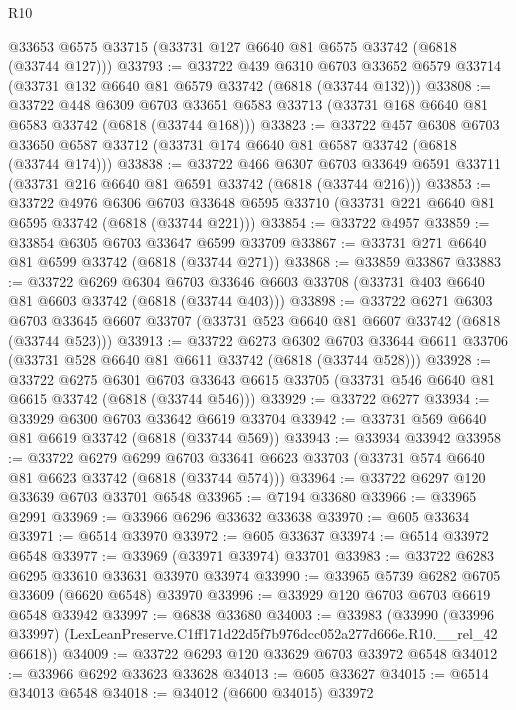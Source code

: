 \begin{lexlean}{R10}
\begin{coremodule}
    @33653
    @6575
    @33715
    (@33731 @127 @6640 @81 @6575 @33742 (@6818 (@33744 @127)))
@33793 := @33722
    @439
    @6310
    @6703
    @33652
    @6579
    @33714
    (@33731 @132 @6640 @81 @6579 @33742 (@6818 (@33744 @132)))
@33808 := @33722
    @448
    @6309
    @6703
    @33651
    @6583
    @33713
    (@33731 @168 @6640 @81 @6583 @33742 (@6818 (@33744 @168)))
@33823 := @33722
    @457
    @6308
    @6703
    @33650
    @6587
    @33712
    (@33731 @174 @6640 @81 @6587 @33742 (@6818 (@33744 @174)))
@33838 := @33722
    @466
    @6307
    @6703
    @33649
    @6591
    @33711
    (@33731 @216 @6640 @81 @6591 @33742 (@6818 (@33744 @216)))
@33853 := @33722
    @4976
    @6306
    @6703
    @33648
    @6595
    @33710
    (@33731 @221 @6640 @81 @6595 @33742 (@6818 (@33744 @221)))
@33854 := @33722 @4957
@33859 := @33854 @6305 @6703 @33647 @6599 @33709
@33867 := @33731 @271 @6640 @81 @6599 @33742 (@6818 (@33744 @271))
@33868 := @33859 @33867
@33883 := @33722
    @6269
    @6304
    @6703
    @33646
    @6603
    @33708
    (@33731 @403 @6640 @81 @6603 @33742 (@6818 (@33744 @403)))
@33898 := @33722
    @6271
    @6303
    @6703
    @33645
    @6607
    @33707
    (@33731 @523 @6640 @81 @6607 @33742 (@6818 (@33744 @523)))
@33913 := @33722
    @6273
    @6302
    @6703
    @33644
    @6611
    @33706
    (@33731 @528 @6640 @81 @6611 @33742 (@6818 (@33744 @528)))
@33928 := @33722
    @6275
    @6301
    @6703
    @33643
    @6615
    @33705
    (@33731 @546 @6640 @81 @6615 @33742 (@6818 (@33744 @546)))
@33929 := @33722 @6277
@33934 := @33929 @6300 @6703 @33642 @6619 @33704
@33942 := @33731 @569 @6640 @81 @6619 @33742 (@6818 (@33744 @569))
@33943 := @33934 @33942
@33958 := @33722
    @6279
    @6299
    @6703
    @33641
    @6623
    @33703
    (@33731 @574 @6640 @81 @6623 @33742 (@6818 (@33744 @574)))
@33964 := @33722 @6297 @120 @33639 @6703 @33701 @6548
@33965 := @7194 @33680
@33966 := @33965 @2991
@33969 := @33966 @6296 @33632 @33638
@33970 := @605 @33634
@33971 := @6514 @33970
@33972 := @605 @33637
@33974 := @6514 @33972 @6548
@33977 := @33969 (@33971 @33974) @33701
@33983 := @33722 @6283 @6295 @33610 @33631 @33970 @33974
@33990 := @33965 @5739 @6282 @6705 @33609 (@6620 @6548) @33970
@33996 := @33929 @120 @6703 @6703 @6619 @6548 @33942
@33997 := @6838 @33680
@34003 := @33983
    (@33990 (@33996 @33997) (LexLeanPreserve.C1ff171d22d5f7b976dcc052a277d666e.R10.__rel_42 @6618))
@34009 := @33722 @6293 @120 @33629 @6703 @33972 @6548
@34012 := @33966 @6292 @33623 @33628
@34013 := @605 @33627
@34015 := @6514 @34013 @6548
@34018 := @34012 (@6600 @34015) @33972

\end{coremodule}
\end{lexlean}
